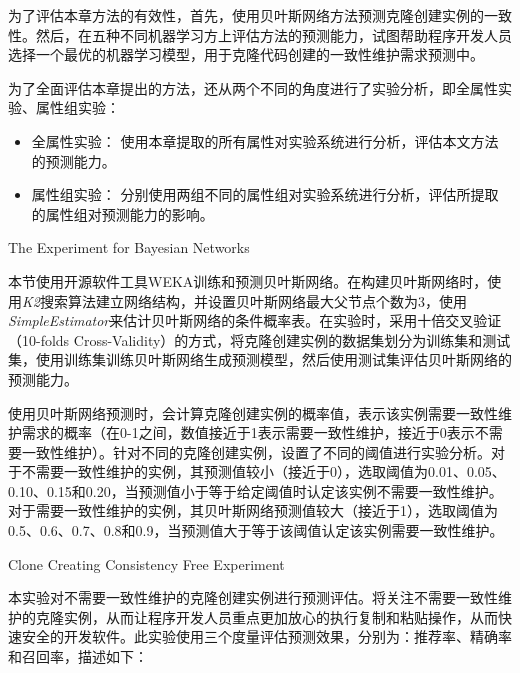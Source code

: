 为了评估本章方法的有效性，首先，使用贝叶斯网络方法预测克隆创建实例的一致性。然后，在五种不同机器学习方上评估方法的预测能力，试图帮助程序开发人员选择一个最优的机器学习模型，用于克隆代码创建的一致性维护需求预测中。

为了全面评估本章提出的方法，还从两个不同的角度进行了实验分析，即全属性实验、属性组实验：

\begin{itemize}
\item
全属性实验：
使用本章提取的所有属性对实验系统进行分析，评估本文方法的预测能力。
\item
属性组实验：
分别使用两组不同的属性组对实验系统进行分析，评估所提取的属性组对预测能力的影响。
\end{itemize}


{The Experiment for Bayesian Networks}
\label{ref-creatingbayesianmetrics}

本节使用开源软件工具WEKA训练和预测贝叶斯网络。在构建贝叶斯网络时，使用{\em K2}搜索算法建立网络结构，并设置贝叶斯网络最大父节点个数为3，使用{\em  SimpleEstimator}来估计贝叶斯网络的条件概率表。在实验时，采用十倍交叉验证（10-folds Cross-Validity）的方式，将克隆创建实例的数据集划分为训练集和测试集，使用训练集训练贝叶斯网络生成预测模型，然后使用测试集评估贝叶斯网络的预测能力。

使用贝叶斯网络预测时，会计算克隆创建实例的概率值，表示该实例需要一致性维护需求的概率（在0-1之间，数值接近于1表示需要一致性维护，接近于0表示不需要一致性维护）。针对不同的克隆创建实例，设置了不同的阈值进行实验分析。对于不需要一致性维护的实例，其预测值较小（接近于0），选取阈值为0.01、0.05、0.10、0.15和0.20，当预测值小于等于给定阈值时认定该实例不需要一致性维护。对于需要一致性维护的实例，其贝叶斯网络预测值较大（接近于1），选取阈值为0.5、0.6、0.7、0.8和0.9，当预测值大于等于该阈值认定该实例需要一致性维护。

{Clone Creating Consistency Free Experiment}

本实验对不需要一致性维护的克隆创建实例进行预测评估。将关注不需要一致性维护的克隆实例，从而让程序开发人员重点更加放心的执行复制和粘贴操作，从而快速安全的开发软件。此实验使用三个度量评估预测效果，分别为：推荐率、精确率和召回率，描述如下：

